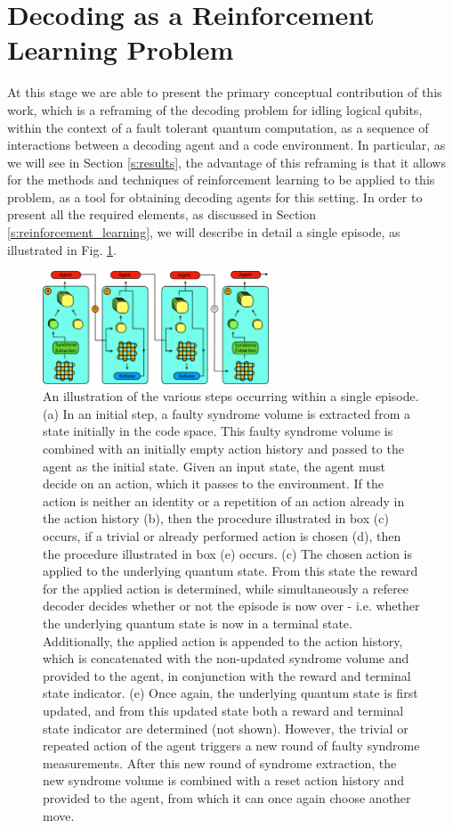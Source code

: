 \documentclass[twocolumn,preprintnumbers,amsmath,amssymb,notitlepage,nofootinbib,longbibliography,superscriptaddress,aps,pra,10pt]{revtex4-1}
\begin{document}
\section{Decoding as a Reinforcement Learning Problem}\label{s:decoding_as_rl}

    At this stage we are able to present the primary conceptual contribution of this work, which is a reframing of the decoding problem for idling logical qubits, within the context of a fault tolerant quantum computation, as a sequence of interactions between a decoding agent and a code environment.
    In particular, as we will see in Section \ref{s:results}, the advantage of this reframing is that it allows for the methods and techniques of reinforcement learning to be applied to this problem, as a tool for obtaining decoding agents for this setting. 
    In order to present all the required elements, as discussed in Section \ref{s:reinforcement_learning}, we will describe in detail a single episode, as illustrated in Fig. \ref{f:single_episode}.

    \begin{figure}
      \centering
      \includegraphics[width=0.6\textwidth]{figures/decoding_as_rl.pdf}
      \caption{An illustration of the various steps occurring within a single episode. (a) In an initial step, a faulty syndrome volume is extracted from a state initially in the code space. This faulty syndrome volume is combined with an initially empty action history and passed to the agent as the initial state. Given an input state, the agent must decide on an action, which it passes to the environment. If the action is neither an identity or a repetition of an action already in the action history (b), then the procedure illustrated in box (c) occurs, if a trivial or already performed action is chosen (d), then the procedure illustrated in box (e) occurs. (c) The chosen action is applied to the underlying quantum state. From this state the reward for the applied action is determined, while simultaneously a referee decoder decides whether or not the episode is now over - i.e. whether the underlying quantum state is now in a terminal state. Additionally, the applied action is appended to the action history, which is concatenated with the non-updated syndrome volume and provided to the agent, in conjunction with the reward and terminal state indicator. (e) Once again, the underlying quantum state is first updated, and from this updated state both a reward and terminal state indicator are determined (not shown). However, the trivial or repeated action of the agent triggers a new round of faulty syndrome measurements. After this new round of syndrome extraction, the new syndrome volume is combined with a reset action history and provided to the agent, from which it can once again choose another move.}\label{f:single_episode}
    \end{figure}
\end{document}
